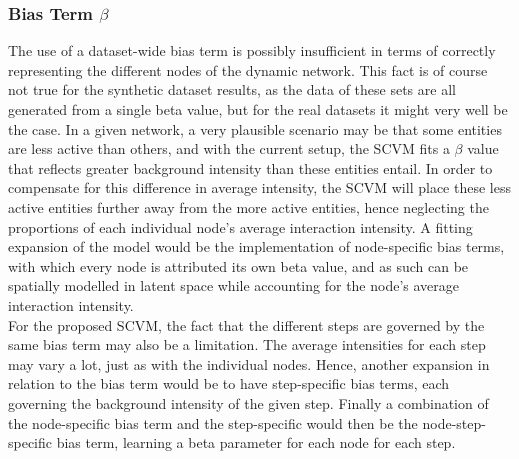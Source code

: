 \subsubsection{Bias Term $\beta$}
\label{sec:Discussion:Results:BiasTerm}
The use of a dataset-wide bias term is possibly insufficient in terms of correctly representing the different nodes of the dynamic network. 
This fact is of course not true for the synthetic dataset results, as the data of these sets are all generated from a single beta value, but for the real datasets it might very well be the case.
In a given network, a very plausible scenario may be that some entities are less active than others, and with the current setup, the SCVM fits a $\beta$ value that reflects greater background intensity than these entities entail.
In order to compensate for this difference in average intensity, the SCVM will place these less active entities further away from the more active entities, hence neglecting the proportions of each individual node's average interaction intensity.
A fitting expansion of the model would be the implementation of node-specific bias terms, with which every node is attributed its own beta value, and as such can be spatially modelled in latent space while accounting for the node's average interaction intensity. 
\\
For the proposed SCVM, the fact that the different steps are governed by the same bias term may also be a limitation. 
The average intensities for each step may vary a lot, just as with the individual nodes.
Hence, another expansion in relation to the bias term would be to have step-specific bias terms, each governing the background intensity of the given step.
Finally a combination of the node-specific bias term and the step-specific would then be the node-step-specific bias term, learning a beta parameter for each node for each step.


